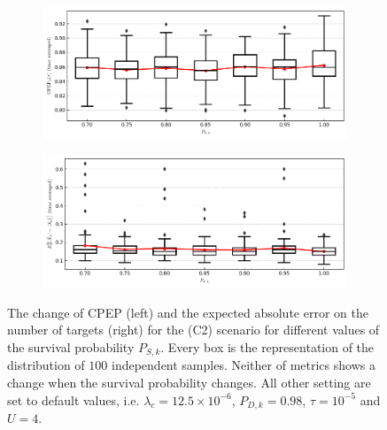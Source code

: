 \begin{figure}
    \centering
    \begin{subfigure}[]{0.48\linewidth}
        \centering
        \includegraphics[width=\linewidth]{figures/c2-ps-cpep.png}
    \end{subfigure}
    \hfill
    \begin{subfigure}[]{0.48\linewidth}
        \centering
        \includegraphics[width=\linewidth]{figures/c2-ps-eae.png}
    \end{subfigure}
  \caption[(C2). Change of performance depending on the survival probability.]{The change of CPEP (left) and the expected absolute error on the number of targets (right) for the (C2) scenario for different values of the survival probability $P_{S,k}$. Every box is the representation of the distribution of $100$ independent samples. Neither of metrics shows a change when the survival probability changes. All other setting are set to default values, i.e. $\lambda_{c} = 12.5 \times 10^{-6}$, $P_{D,k} = 0.98$, $\tau = 10^{-5}$ and $U = 4$.}
  \label{fig:c2-ps}
\end{figure}

